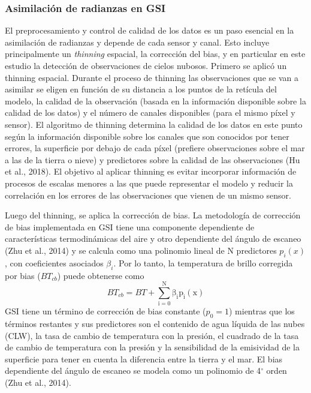 \documentclass[12pt,oneside,a4paper]{reedthesis}
\begin{document}
\hypertarget{sat}{%
\subsubsection{Asimilación de radianzas en GSI}\label{sat}}

El preprocesamiento y control de calidad de los datos es un paso esencial en la asimilación de radianzas y depende de cada sensor y canal. Esto incluye principalmente un \emph{thinning} espacial, la corrección del bias, y en particular en este estudio la detección de observaciones de cielos nubosos. Primero se aplicó un thinning espacial. Durante el proceso de thinning las observaciones que se van a asimilar se eligen en función de su distancia a los puntos de la retícula del modelo, la calidad de la observación (basada en la información disponible sobre la calidad de los datos) y el número de canales disponibles (para el mismo píxel y sensor). El algoritmo de thinning determina la calidad de los datos en este punto según la información disponible sobre los canales que son conocidos por tener errores, la superficie por debajo de cada píxel (prefiere observaciones sobre el mar a las de la tierra o nieve) y predictores sobre la calidad de las observaciones (Hu et al., 2018). El objetivo al aplicar thinning es evitar incorporar información de procesos de escalas menores a las que puede representar el modelo y reducir la correlación en los errores de las observaciones que vienen de un mismo sensor.

Luego del thinning, se aplica la corrección de bias. La metodología de corrección de bias implementada en GSI tiene una componente dependiente de características termodinámicas del aire y otro dependiente del ángulo de escaneo (Zhu et al., 2014) y se calcula como una polinomio lineal de N predictores \(p_i(x)\), con coeficientes asociados \(\beta_i\). Por lo tanto, la temperatura de brillo corregida por bias (\(BT_{cb}\)) puede obtenerse como
\begin{equation}
\mathrm{\mathit{BT_{cb}} =\mathit{ BT} + \sum_{i = 0}^{N} \beta_i p_i (x)}
\label{eq:eq12}
\end{equation}
GSI tiene un término de corrección de bias constante (\(p_0 = 1\)) mientras que los términos restantes y sus predictores son el contenido de agua líquida de las nubes (CLW), la tasa de cambio de temperatura con la presión, el cuadrado de la tasa de cambio de temperatura con la presión y la sensibilidad de la emisividad de la superficie para tener en cuenta la diferencia entre la tierra y el mar. El bias dependiente del ángulo de escaneo se modela como un polinomio de 4\(^\circ\) orden (Zhu et al., 2014).
\end{document}
